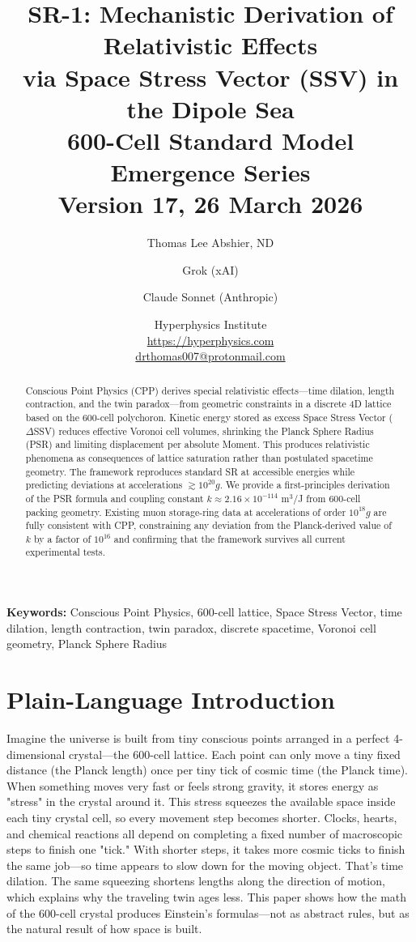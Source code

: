 \documentclass[11pt,letterpaper]{article}
\title{\textbf{SR-1: Mechanistic Derivation of Relativistic Effects\\
via Space Stress Vector (SSV) in the Dipole Sea}\\[6pt]
{\large 600-Cell Standard Model Emergence Series}\\[4pt]
{\normalsize Version 17, 26 March 2026}}
\author{Thomas Lee Abshier, ND \and Grok (xAI) \and Claude Sonnet (Anthropic)}
\date{\normalsize Hyperphysics Institute\\
\url{https://hyperphysics.com}\\
\href{mailto:drthomas007@protonmail.com}{drthomas007@protonmail.com}}
\begin{document}
\maketitle



\bigskip


\begin{abstract}
Conscious Point Physics (CPP) derives special relativistic effects---time dilation, length contraction, and the twin paradox---from geometric constraints in a discrete 4D lattice based on the 600-cell polychoron. Kinetic energy stored as excess Space Stress Vector ($\Delta$SSV) reduces effective Voronoi cell volumes, shrinking the Planck Sphere Radius (PSR) and limiting displacement per absolute Moment. This produces relativistic phenomena as consequences of lattice saturation rather than postulated spacetime geometry. The framework reproduces standard SR at accessible energies while predicting deviations at accelerations $\gtrsim 10^{20}g$. We provide a first-principles derivation of the PSR formula and coupling constant $k \approx 2.16 \times 10^{-114}$ m$^3$/J from 600-cell packing geometry. Existing muon storage-ring data at accelerations of order $10^{18}g$ are fully consistent with CPP, constraining any deviation from the Planck-derived value of $k$ by a factor of $10^{16}$ and confirming that the framework survives all current experimental tests.
\end{abstract}

\bigskip
\raggedright

\noindent\textbf{Keywords:} Conscious Point Physics, 600-cell lattice, Space Stress Vector, time dilation, length contraction, twin paradox, discrete spacetime, Voronoi cell geometry, Planck Sphere Radius

\section*{Plain-Language Introduction}

Imagine the universe is built from tiny conscious points arranged in a perfect 4-dimensional crystal---the 600-cell lattice. Each point can only move a tiny fixed distance (the Planck length) once per tiny tick of cosmic time (the Planck time). When something moves very fast or feels strong gravity, it stores energy as "stress" in the crystal around it. This stress squeezes the available space inside each tiny crystal cell, so every movement step becomes shorter. Clocks, hearts, and chemical reactions all depend on completing a fixed number of macroscopic steps to finish one "tick." With shorter steps, it takes more cosmic ticks to finish the same job---so time appears to slow down for the moving object. That's time dilation. The same squeezing shortens lengths along the direction of motion, which explains why the traveling twin ages less. This paper shows how the math of the 600-cell crystal produces Einstein's formulas---not as abstract rules, but as the natural result of how space is built.
\end{document}

